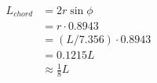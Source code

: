 \documentclass[12pt]{article}
\begin{document}
\begin{align*}
L_{chord} &= 2r\sin\phi \\
          &= r \cdot 0.8943 \\
          &= (L/7.356) \cdot 0.8943 \\
          &= 0.1215 L \\
					&\approx \frac{1}{8} L
\end{align*}
\end{document}
